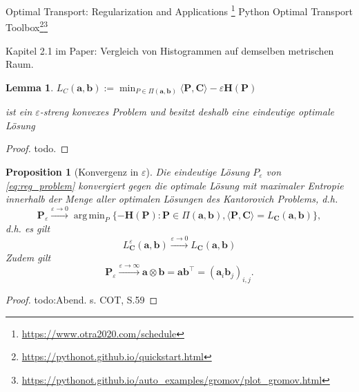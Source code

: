 \documentclass[twoside, 11pt,a4paper]{article}
\DeclareMathOperator*{\argmin}{arg\,min}
\newtheorem{lemma}[theorem]{Lemma}
\newtheorem{proposition}[theorem]{Proposition}
\numberwithin{equation}{section}
\begin{document}
	Optimal Transport: Regularization and Applications
	\footnote{\url{https://www.otra2020.com/schedule}}
	Python Optimal Transport Toolbox\footnote{\url{https://pythonot.github.io/quickstart.html}}\footnote{\url{https://pythonot.github.io/auto_examples/gromov/plot_gromov.html}}
	
	Kapitel 2.1 im Paper: Vergleich von Histogrammen auf demselben metrischen Raum.
	
	\begin{lemma}
		$L_C(\boldsymbol{a}, \boldsymbol{b}):= \min_{P \in \Pi(\boldsymbol{a}, \boldsymbol{b})} \langle \boldsymbol{P}, \boldsymbol{C} \rangle - \varepsilon \boldsymbol{H}(\boldsymbol{P})$\label{eq:reg_problem}
		
		ist ein $\varepsilon$-streng konvexes Problem und besitzt deshalb eine eindeutige optimale Lösung
		
	\end{lemma}
	
	\begin{proof}
		todo.
	\end{proof}
	
	\begin{proposition}[Konvergenz in $\varepsilon$]
		Die eindeutige Lösung $P_\varepsilon$ von \autoref{eq:reg_problem} konvergiert gegen die optimale Lösung mit maximaler Entropie innerhalb der Menge aller optimalen Lösungen des Kantorovich Problems, d.h.
		\begin{equation}
		\boldsymbol{P}_\varepsilon \xrightarrow{\varepsilon \to 0} \argmin_{P} \lbrace -\boldsymbol{H}(\boldsymbol{P}) : \boldsymbol{P} \in \Pi (\boldsymbol{a}, \boldsymbol{b}), \langle \boldsymbol{P}, \boldsymbol{C} \rangle = L_{\boldsymbol{C}}(\boldsymbol{a}, \boldsymbol{b}) \rbrace, \label{eq:P_eps_0}
		\end{equation}
		d.h. es gilt
		\begin{equation}
		L_{\boldsymbol{C}}^\varepsilon (\boldsymbol{a}, \boldsymbol{b}) \xrightarrow{\varepsilon \to 0} L_{\boldsymbol{C}}(\boldsymbol{a}, \boldsymbol{b})
		\end{equation}
		Zudem gilt
		\begin{equation}
		\boldsymbol{P}_\varepsilon \xrightarrow{\varepsilon \to \infty} \boldsymbol{a} \otimes \boldsymbol{b} = \boldsymbol{a} \boldsymbol{b}^\top = (\boldsymbol{a}_i \boldsymbol{b}_j)_{i,j}. \label{eq:P_eps_infty}
		\end{equation}
	\end{proposition}
	
	\begin{proof}
		todo:Abend. s. COT, S.59
	\end{proof}
	
\end{document}
